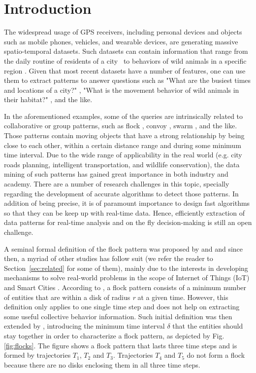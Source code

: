 \chapter{Introduction}
\label{chp:introduction}
The widespread usage of GPS receivers, including personal devices and objects such as mobile phones, vehicles, and
wearable devices, are generating massive spatio-temporal datasets. Such datasets can contain information that range from
the daily routine of residents of a city~\citep{whatdidyoudo} to behaviors of wild animals in a specific region
\citep{trajclustering}\citep{miningperiodic}. Given that most recent datasets have a number of features, one can
use them to extract patterns to answer questions such as "What are the busiest times and locations of a city?"
\citep{smartcities}\citep{visualtrafficjam}, "What is the movement behavior of wild animals in their habitat?"
\citep{movemine}, and the like.

In the aforementioned examples, some of the  queries are intrinsically related to collaborative or group patterns, such
as flock \citep{gudefficient}, convoy \citep{convoy}, swarm \citep{swarm}, and the like. Those patterns
contain moving objects that have a strong relationship by being close to each other, within a certain distance range and
during some minimum time interval. Due to the wide range of applicability in the real world (e.g. city roads planning,
intelligent transportation, and wildlife conservation), the data mining of such patterns has gained great importance in
both industry and academy. There are a number of research challenges in this topic, specially regarding the development
of accurate algorithms to detect those patterns. In addition of being precise, it is of paramount importance to design
fast algorithms so that they can be keep up with real-time data. Hence, efficiently extraction of data patterns for
real-time analysis and on the fly decision-making is still an open challenge.

A seminal formal definition of the flock pattern was proposed by \citep{remo} and \citep{gudefficient} and since
then, a myriad of other studies has follow suit (we refer the reader to Section~\ref{sec:related} for some of them),
mainly due to the interests in developing mechanisms to solve real-world problems in the scope of Internet of Things
(IoT) \citep{iot} and Smart Cities \citep{smartcities}. According to \citep{gudefficient}, a flock pattern
consists of a minimum number of entities that are within a disk of radius \textit{r} at a given time. However, this
definition only applies to one single time step and does not help on extracting some useful collective behavior
information. Such initial definition was then extended by \citep{gudreportingflock}, introducing the minimum time
interval $\delta$ that the entities should stay together in order to characterize a flock pattern, as depicted by Fig.
\ref{fig:flocks}. The figure shows a flock pattern that lasts three time steps and is formed by trajectories $T_1$,
$T_2$ and $T_3$. Trajectories $T_4$ and $T_5$ do not form a flock because there are no disks enclosing them in all three
time steps.

